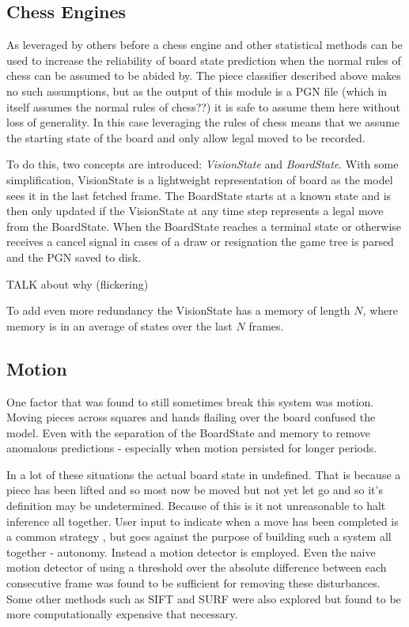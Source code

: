 \subsection{Chess Engines}
As leveraged by others before \cite{} a chess engine and other statistical methods \cite{} can be used to increase the reliability of board state 
prediction when the normal rules of chess can be assumed to be abided by.  The piece classifier described above makes no such assumptions, but as 
the output of this module is a PGN file (which in itself assumes the normal rules of chess??) it is safe to assume them here without loss of 
generality.  In this case leveraging the rules of chess means that we assume the starting state of the board and only allow legal moved to be recorded.

To do this, two concepts are introduced: \textit{VisionState} and \textit{BoardState}.  With some simplification, VisionState is a lightweight 
representation of board as the model sees it in the last fetched frame.  The BoardState starts at a known state and is then only updated if the VisionState at 
any time step represents a legal move from the BoardState. When the BoardState reaches a terminal state or otherwise receives a cancel signal in cases of a 
draw or resignation the game tree is parsed and the PGN saved to disk.

TALK about why (flickering)

To add even more redundancy the VisionState has a memory of length $N$, where memory is in an average of states over the last $N$ frames.

\subsection{Motion}
One factor that was found to still sometimes break this system was motion.  Moving pieces across squares and hands flailing over the board confused the
model.  Even with the separation of the BoardState and memory to remove anomalous predictions - especially when motion persisted for longer periods.  

In a lot of these situations the actual board state in undefined.  That is because a piece has been lifted and so most now be moved but not yet let go 
and so it's definition may be undetermined.  Because of this is it not unreasonable to halt inference all together.  User input to indicate when a move
has been completed is a common strategy \cite{}, but goes against the purpose of building such a system all together - autonomy.  Instead a motion detector is 
employed.  Even the naive motion detector of using a threshold over the absolute difference between each consecutive frame was found to be sufficient for removing these
disturbances.  Some other methods such as SIFT and SURF were also explored but found to be more computationally expensive that necessary.
